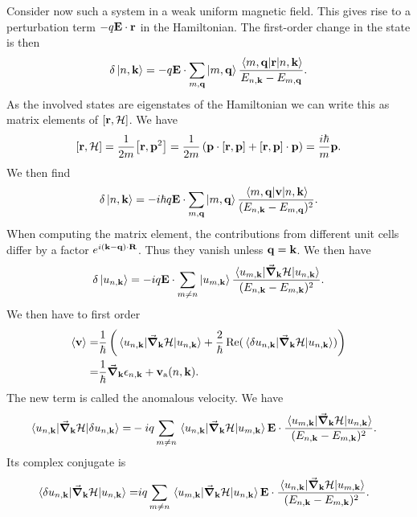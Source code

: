 Consider now such a system in a weak uniform magnetic field. This gives rise to a perturbation term $-q\vb{E}\cdot\vb{r}$ in the Hamiltonian. The first-order change in the state is then
\begin{align*}
	\delta\ket{n, \vb{k}} = -q\vb{E}\cdot\sum\limits_{m, \vb{q}}\ket{m, \vb{q}}\frac{\mel{m, \vb{q}}{\vb{r}}{n, \vb{k}}}{E_{n, \vb{k}} - E_{m, \vb{q}}}.
\end{align*}
As the involved states are eigenstates of the Hamiltonian we can write this as matrix elements of $\comm{\vb{r}}{\ham}$. We have
\begin{align*}
	\comm{\vb{r}}{\ham} = \frac{1}{2m}\comm{\vb{r}}{\vb{p}^{2}} = \frac{1}{2m}\left(\vb{p}\cdot\comm{\vb{r}}{\vb{p}} + \comm{\vb{r}}{\vb{p}}\cdot\vb{p}\right) = \frac{i\hbar}{m}\vb{p}.
\end{align*}
We then find
\begin{align*}
	\delta\ket{n, \vb{k}} = -i\hbar q\vb{E}\cdot\sum\limits_{m, \vb{q}}\ket{m, \vb{q}}\frac{\mel{m, \vb{q}}{\vb{v}}{n, \vb{k}}}{(E_{n, \vb{k}} - E_{m, \vb{q}})^{2}}.
\end{align*}
When computing the matrix element, the contributions from different unit cells differ by a factor $e^{i(\vb{k} - \vb{q})\cdot\vb{R}}$. Thus they vanish unless $\vb{q} = \vb{k}$. We then have
\begin{align*}
	\delta\ket{u_{n, \vb{k}}} = -iq\vb{E}\cdot\sum\limits_{m\neq n}\ket{u_{m, \vb{k}}}\frac{\mel{u_{m, \vb{k}}}{\grad_{\vb{k}}\ensuremath{\mathcal{H}}}{u_{n, \vb{k}}}}{(E_{n, \vb{k}} - E_{m, \vb{k}})^{2}}.
\end{align*}
We then have to first order
\begin{align*}
	\expval{\vb{v}} =& \frac{1}{\hbar}\left(\expval{\grad_{\vb{k}}\ensuremath{\mathcal{H}}}{u_{n, \vb{k}}} + \frac{2}{\hbar}\Re(\mel{\delta u_{n, \vb{k}}}{\grad_{\vb{k}}\ensuremath{\mathcal{H}}}{u_{n, \vb{k}}})\right) \\
	                =& \frac{1}{\hbar}\grad_{\vb{k}}\epsilon_{n, \vb{k}} + \vb{v}_{\text{a}}(n, \vb{k}).
\end{align*}
The new term is called the anomalous velocity. We have
\begin{align*}
	\mel{u_{n, \vb{k}}}{\grad_{\vb{k}}\ensuremath{\mathcal{H}}}{\delta u_{n, \vb{k}}} =&  -iq\sum\limits_{m\neq n}\mel{u_{n, \vb{k}}}{\grad_{\vb{k}}\ensuremath{\mathcal{H}}}{u_{m, \vb{k}}}\vb{E}\cdot\frac{\mel{u_{m, \vb{k}}}{\grad_{\vb{k}}\ensuremath{\mathcal{H}}}{u_{n, \vb{k}}}}{(E_{n, \vb{k}} - E_{m, \vb{k}})^{2}}.
\end{align*}
Its complex conjugate is
\begin{align*}
	\mel{\delta u_{n, \vb{k}}}{\grad_{\vb{k}}\ensuremath{\mathcal{H}}}{u_{n, \vb{k}}} =&  iq\sum\limits_{m\neq n}\mel{u_{m, \vb{k}}}{\grad_{\vb{k}}\ensuremath{\mathcal{H}}}{u_{n, \vb{k}}}\vb{E}\cdot\frac{\mel{u_{n, \vb{k}}}{\grad_{\vb{k}}\ensuremath{\mathcal{H}}}{u_{m, \vb{k}}}}{(E_{n, \vb{k}} - E_{m, \vb{k}})^{2}}.
\end{align*}

